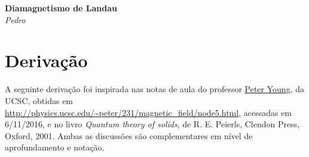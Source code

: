\documentclass{article}
\begin{document}
\begin{center}
  \begin{minipage}{8cm}
    \Large\textbf{Diamagnetismo de Landau}\\
    \large\textit{Pedro}
  \end{minipage}
\end{center}
\vspace{1cm}

\section{Derivação}
A seguinte derivação foi inspirada nas notas de aula do professor \href{http://young.physics.ucsc.edu/}{Peter Young},
da UCSC, obtidas em \url{http://physics.ucsc.edu/~peter/231/magnetic_field/node5.html}, acessadas em 6/11/2016, e no
livro \textit{Quantum theory of solids}, de R. E. Peierls, Clendon Press, Oxford, 2001. Ambas as discussões são
complementares em nível de aprofundamento e notação.
\end{document}
